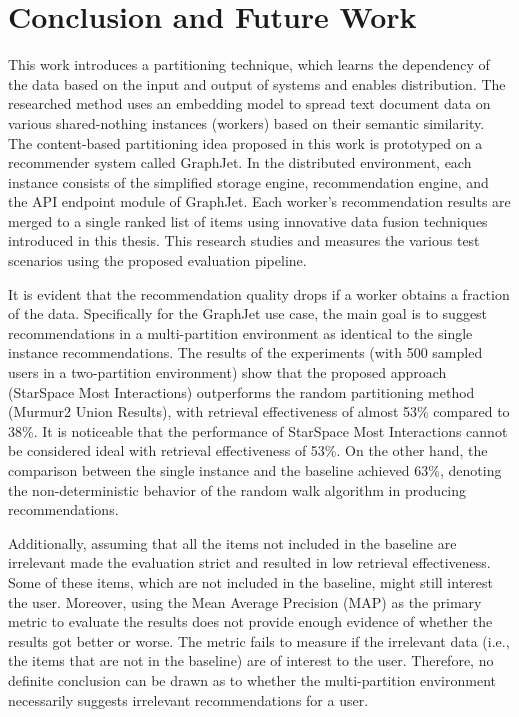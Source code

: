 \chapter{Conclusion and Future Work}
\label{chap:conclusion}
This work introduces a partitioning technique, which learns the dependency of the data based on the input and output of systems and enables distribution. The researched method uses an embedding model to spread text document data on various shared-nothing instances (workers) based on their semantic similarity. The content-based partitioning idea proposed in this work is prototyped on a recommender system called GraphJet. In the distributed environment, each instance consists of the simplified storage engine, recommendation engine, and the API endpoint module of GraphJet. Each worker's recommendation results are merged to a single ranked list of items using innovative data fusion techniques introduced in this thesis. This research studies and measures the various test scenarios using the proposed evaluation pipeline.


It is evident that the recommendation quality drops if a worker obtains a fraction of the data. Specifically for the GraphJet use case, the main goal is to suggest recommendations in a multi-partition environment as identical to the single instance recommendations. The results of the experiments (with 500 sampled users in a two-partition environment) show that the proposed approach (StarSpace Most Interactions) outperforms the random partitioning method (Murmur2 Union Results), with retrieval effectiveness of almost 53\% compared to 38\%. It is noticeable that the performance of StarSpace Most Interactions cannot be considered ideal with retrieval effectiveness of 53\%. On the other hand, the comparison between the single instance and the baseline achieved 63\%, denoting the non-deterministic behavior of the random walk algorithm in producing recommendations.


Additionally, assuming that all the items not included in the baseline are irrelevant made the evaluation strict and resulted in low retrieval effectiveness. Some of these items, which are not included in the baseline, might still interest the user. Moreover, using the Mean Average Precision (MAP) as the primary metric to evaluate the results does not provide enough evidence of whether the results got better or worse. The metric fails to measure if the irrelevant data (i.e., the items that are not in the baseline) are of interest to the user. Therefore, no definite conclusion can be drawn as to whether the multi-partition environment necessarily suggests irrelevant recommendations for a user. 



